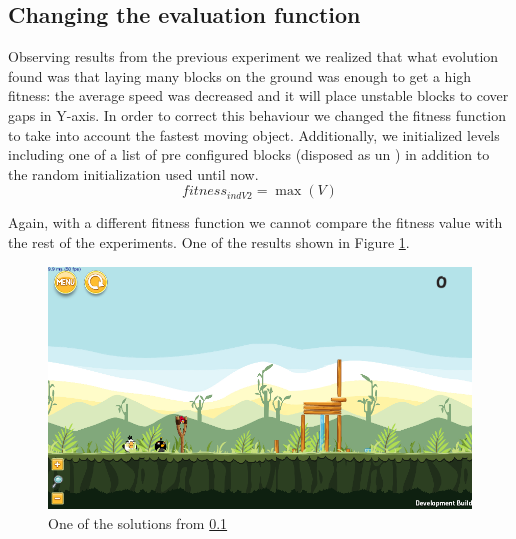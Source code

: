 \documentclass[sigconf]{acmart}
\begin{document}
\subsection{Changing the evaluation function}\label{E6}

Observing results from the previous experiment we realized that what
evolution found was that laying many blocks on the ground was enough
to get a high fitness: the average speed was decreased and it will
place unstable blocks to cover gaps in Y-axis. 
In order to correct this behaviour we changed the 
fitness function to take into account the fastest moving object. 
Additionally, we initialized levels including one of a list of pre configured
blocks (disposed as un \cite{ferreira2014search}) in addition to the random initialization used until now.
$$fitness_{indV2} = \max{(V)}$$

Again, with a different fitness function we cannot compare the fitness
value with the rest of the experiments. One of the results shown in 
Figure \ref{f:e6}.
 \begin{figure}
 	\centering
 	\includegraphics[scale=0.3]{E6.png}
 	\caption{One of the solutions from \ref{E6}}\label{f:e6}
 \end{figure}





%
\end{document}
